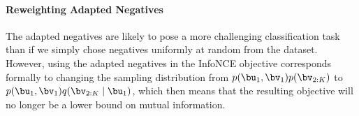 

\paragraph{Reweighting Adapted Negatives}

The adapted negatives are likely to pose a more challenging classification task than if we simply chose negatives uniformly at random from the dataset.
However, using the adapted negatives in the InfoNCE objective corresponds formally to changing the sampling distribution from $p(\bu_1, \bv_1)p(\bv_{2:K})$ to $p(\bu_1, \bv_1)q(\bv_{2:K}\mid\bu_1)$, which then means that the resulting objective will no longer be a lower bound on mutual information.

